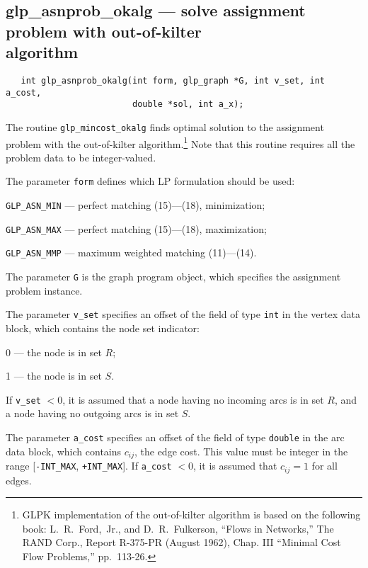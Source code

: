 \documentclass[11pt]{report}
\def\para#1{\noindent{\bf#1}}
\def\synopsis{\para{Synopsis}}
\def\description{\para{Description}}
\begin{document}
\subsection{glp\_asnprob\_okalg --- solve assignment problem with
out-of-kilter\\algorithm}

\synopsis

\begin{verbatim}
   int glp_asnprob_okalg(int form, glp_graph *G, int v_set, int a_cost,
                         double *sol, int a_x);
\end{verbatim}

\description

The routine \verb|glp_mincost_okalg| finds optimal solution to the
assignment problem with the out-of-kilter
algorithm.\footnote{GLPK implementation of the out-of-kilter algorithm
is based on the following book: L.~R.~Ford,~Jr., and D.~R.~Fulkerson,
``Flows in Networks,'' The RAND Corp., Report R-375-PR (August 1962),
Chap. III ``Minimal Cost Flow Problems,'' pp.~113-26.} Note that this
routine requires all the problem data to be integer-valued.

The parameter \verb|form| defines which LP formulation should be used:

\verb|GLP_ASN_MIN| --- perfect matching (15)---(18), minimization;

\verb|GLP_ASN_MAX| --- perfect matching (15)---(18), maximization;

\verb|GLP_ASN_MMP| --- maximum weighted matching (11)---(14).

\newpage

The parameter \verb|G| is the graph program object, which specifies the
assignment problem instance.

The parameter \verb|v_set| specifies an offset of the field of type
\verb|int| in the vertex data block, which contains the node set
indicator:

0 --- the node is in set $R$;

1 --- the node is in set $S$.

\noindent
If \verb|v_set| $<0$, it is assumed that a node having no incoming arcs
is in set $R$, and a node having no outgoing arcs is in set $S$.

The parameter \verb|a_cost| specifies an offset of the field of type
\verb|double| in the arc data block, which contains $c_{ij}$, the edge
cost. This value must be integer in the range [\verb|-INT_MAX|,
\verb|+INT_MAX|]. If \verb|a_cost| $<0$, it is assumed that $c_{ij}=1$
for all edges.
\end{document}
